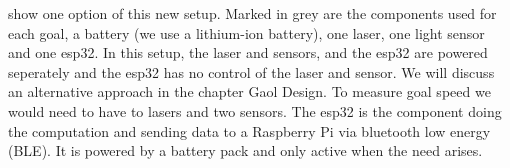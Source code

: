  show one option of this new setup. Marked in grey are the components used for each goal, a battery (we use a lithium-ion battery), one laser, one light sensor and one esp32. In this setup, the laser and sensors, and the esp32 are powered seperately and the esp32 has no control of the laser and sensor. We will discuss an alternative approach in the chapter Gaol Design. To measure goal speed we would need to have to lasers and two sensors. The esp32 is the component doing the computation and sending data to a Raspberry Pi via bluetooth low energy (BLE). It is powered by a battery pack and only active when the need arises.\\

